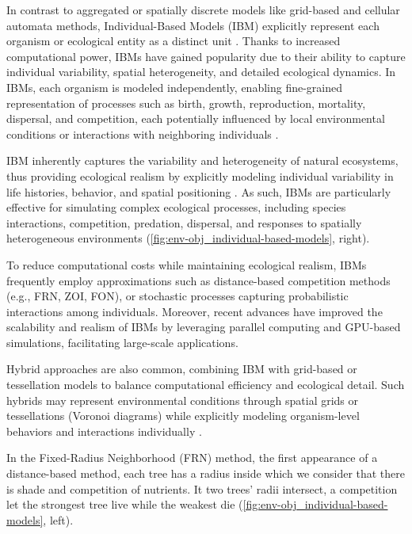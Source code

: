 In contrast to aggregated or spatially discrete models like grid-based and cellular automata methods, Individual-Based Models (IBM) explicitly represent each organism or ecological entity as a distinct unit \cite{Crooks2017}. Thanks to increased computational power, IBMs have gained popularity due to their ability to capture individual variability, spatial heterogeneity, and detailed ecological dynamics. In IBMs, each organism is modeled independently, enabling fine-grained representation of processes such as birth, growth, reproduction, mortality, dispersal, and competition, each potentially influenced by local environmental conditions or interactions with neighboring individuals \cite{Chng2013,Peytavie2024a}.

IBM inherently captures the variability and heterogeneity of natural ecosystems, thus providing ecological realism by explicitly modeling individual variability in life histories, behavior, and spatial positioning \cite{McLane2011,Zhang2020}. As such, IBMs are particularly effective for simulating complex ecological processes, including species interactions, competition, predation, dispersal, and responses to spatially heterogeneous environments  (\cref{fig:env-obj_individual-based-models}, right).

To reduce computational costs while maintaining ecological realism, IBMs frequently employ approximations such as distance-based competition methods (e.g., FRN, ZOI, FON), or stochastic processes capturing probabilistic interactions among individuals. Moreover, recent advances have improved the scalability and realism of IBMs by leveraging parallel computing and GPU-based simulations, facilitating large-scale applications.

Hybrid approaches are also common, combining IBM with grid-based or tessellation models to balance computational efficiency and ecological detail. Such hybrids may represent environmental conditions through spatial grids or tessellations (Voronoi diagrams) while explicitly modeling organism-level behaviors and interactions individually \cite{Chng2011a}.

In the Fixed-Radius Neighborhood (FRN) method, the first appearance of a distance-based method, each tree has a radius inside which we consider that there is shade and competition of nutrients. It two trees' radii intersect, a competition let the strongest tree live while the weakest die (\cref{fig:env-obj_individual-based-models}, left). 

